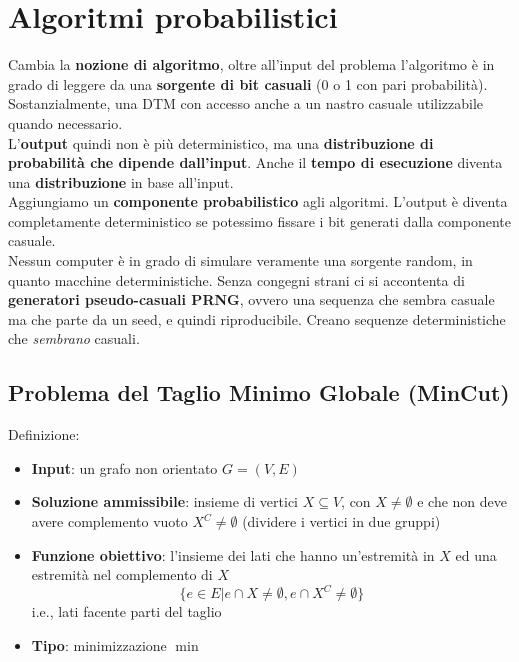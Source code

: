
\section{Algoritmi probabilistici}

Cambia la \textbf{nozione di algoritmo}, oltre all'input del problema l'algoritmo è in grado di leggere da una \textbf{sorgente di bit casuali} (0 o 1 con pari probabilità). Sostanzialmente, una DTM con accesso anche a un nastro casuale utilizzabile quando necessario.\\

L'\textbf{output} quindi non è più deterministico, ma una \textbf{distribuzione di probabilità che dipende dall'input}. Anche il \textbf{tempo di esecuzione} diventa una \textbf{distribuzione} in base all'input.\\

Aggiungiamo un \textbf{componente probabilistico} agli algoritmi. L'output è diventa completamente deterministico se potessimo fissare i bit generati dalla componente casuale.\\

Nessun computer è in grado di simulare veramente una sorgente random, in quanto macchine deterministiche. Senza congegni strani ci si accontenta di \textbf{generatori pseudo-casuali PRNG}, ovvero una sequenza che sembra casuale ma che parte da un seed, e quindi riproducibile. Creano sequenze deterministiche che \textit{sembrano} casuali.\\

\newpage

\subsection{Problema del Taglio Minimo Globale (MinCut)}

Definizione:
\begin{itemize}
	\item \textbf{Input}: un grafo non orientato $G = (V,E)$
	\item \textbf{Soluzione ammissibile}: insieme di vertici $X \subseteq V$, con $X \neq \emptyset$ e che non deve avere complemento vuoto $X^C \neq \emptyset$ (dividere i vertici in due gruppi)
	\item \textbf{Funzione obiettivo}: l'insieme dei lati che hanno un'estremità in $X$ ed una estremità nel complemento di $X$
	$$ \{e \in E | e \cap X \neq \emptyset, e \cap X^C \neq \emptyset \} $$
	i.e., lati facente parti del taglio
	\item \textbf{Tipo}: minimizzazione $\min$
\end{itemize}

